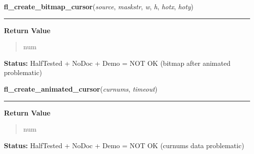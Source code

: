 \hspace{.8\funcindent}\begin{boxedminipage}{\funcwidth}

    \raggedright \textbf{fl\_create\_bitmap\_cursor}(\textit{source}, \textit{maskstr}, \textit{w}, \textit{h}, \textit{hotx}, \textit{hoty})

    \vspace{-1.5ex}

    \rule{\textwidth}{0.5\fboxrule}
\setlength{\parskip}{2ex}
\setlength{\parskip}{1ex}
      \textbf{Return Value}
    \vspace{-1ex}

      \begin{quote}
      num

      \end{quote}

\textbf{Status:} HalfTested + NoDoc + Demo = NOT OK (bitmap after animated problematic)



    \end{boxedminipage}

    \label{xformslib:flcursor:fl_create_animated_cursor}

    \vspace{0.5ex}

\hspace{.8\funcindent}\begin{boxedminipage}{\funcwidth}

    \raggedright \textbf{fl\_create\_animated\_cursor}(\textit{curnums}, \textit{timeout})

    \vspace{-1.5ex}

    \rule{\textwidth}{0.5\fboxrule}
\setlength{\parskip}{2ex}
\setlength{\parskip}{1ex}
      \textbf{Return Value}
    \vspace{-1ex}

      \begin{quote}
      num

      \end{quote}

\textbf{Status:} HalfTested + NoDoc + Demo = NOT OK (curnums data problematic)



    \end{boxedminipage}

